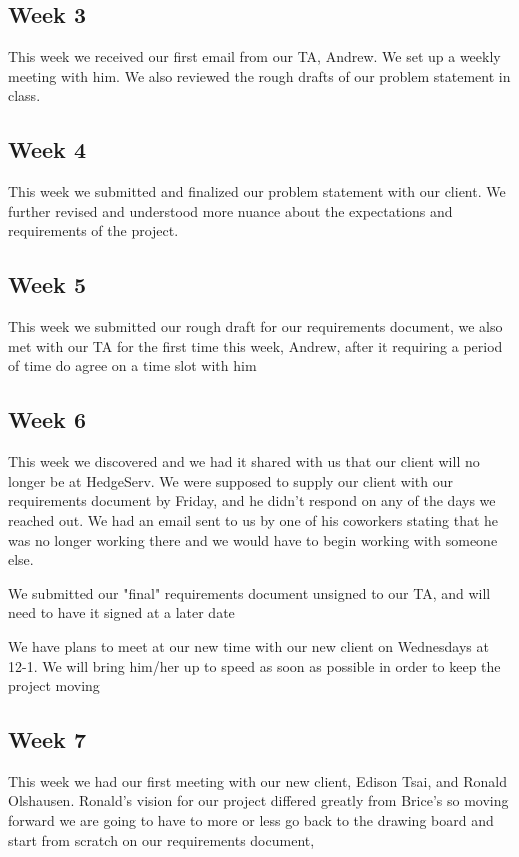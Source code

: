 \documentclass[letterpaper,10pt,titlepage,journal,compsoc,draftclsnofoot,onecolumn]{IEEEtran}
\begin{document}
    \subsection{Week 3}
    This week we received our first email from our TA, Andrew. We set up a weekly meeting with him. We also reviewed the rough drafts of our problem statement in class.
    
    
    \subsection{Week 4}
    This week we submitted and finalized our problem statement with our client. We further revised and understood more nuance about the expectations and requirements of the project.

    
    \subsection{Week 5}
       This week we submitted our rough draft for our requirements document, we also met with our TA for the first time this week, Andrew, after it requiring a period of time do agree on a time slot with him 
    
    \subsection{Week 6}
        This week we discovered and we had it shared with us that our client will no longer be at HedgeServ. We were supposed to supply our client with our requirements document by Friday, and he didn't respond on any of the days we reached out. We had an email sent to us by one of his coworkers stating that he was no longer working there and we would have to begin working with someone else. 
 
        We submitted our "final" requirements document unsigned to our TA, and will need to have it signed at a later date 
        
        We have plans to meet at our new time with our new client on Wednesdays at 12-1. We will bring him/her up to speed as soon as possible in order to keep the project moving 
            
    
    \subsection{Week 7}
        This week we had our first meeting with our new client, Edison Tsai, and Ronald Olshausen. Ronald's vision for our project differed greatly from Brice's so moving forward we are going to have to more or less go back to the drawing board and start from scratch on our requirements document, 
 
\end{document}
